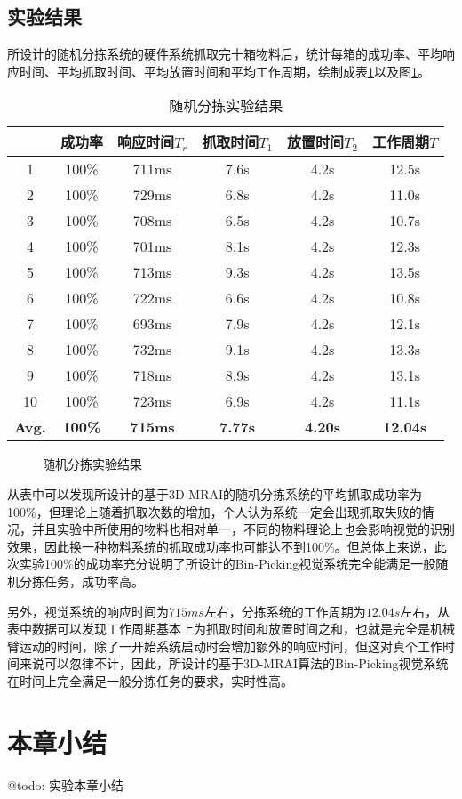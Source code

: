 \subsection{实验结果}
所设计的随机分拣系统的硬件系统抓取完十箱物料后，统计每箱的成功率、平均响应时间、平均抓取时间、平均放置时间和平均工作周期，绘制成表\ref{tab:app_res}以及图\ref{fig:app_res}。
\begin{table}[ht]
  \centering
  \begin{tabular}{cccccc}
    \toprule
    &成功率&响应时间$T_r$&抓取时间$T_1$&放置时间$T_2$&工作周期$T$ \\
    \midrule
    1&100\%&711ms&7.6s&4.2s&12.5s \\
    2&100\%&729ms&6.8s&4.2s&11.0s \\
    3&100\%&708ms&6.5s&4.2s&10.7s \\
    4&100\%&701ms&8.1s&4.2s&12.3s \\
    5&100\%&713ms&9.3s&4.2s&13.5s \\
    6&100\%&722ms&6.6s&4.2s&10.8s \\
    7&100\%&693ms&7.9s&4.2s&12.1s \\
    8&100\%&732ms&9.1s&4.2s&13.3s \\
    9&100\%&718ms&8.9s&4.2s&13.1s \\
    10&100\%&723ms&6.9s&4.2s&11.1s \\
    \bf{Avg.}&\bf{100\%}&\bf{715ms}&\bf{7.77s}&\bf{4.20s}&\bf{12.04s} \\
    \bottomrule
  \end{tabular}
  \caption{随机分拣实验结果}
  \label{tab:app_res}
\end{table}
\begin{figure}[ht]
  \centering
  \hskip0.5cm
  \vfill
  \hskip0.5cm
  \vfill
  \caption{随机分拣实验结果}
  \label{fig:app_res}
\end{figure}
从表中可以发现所设计的基于3D-MRAI的随机分拣系统的平均抓取成功率为100\%，但理论上随着抓取次数的增加，个人认为系统一定会出现抓取失败的情况，并且实验中所使用的物料也相对单一，不同的物料理论上也会影响视觉的识别效果，因此换一种物料系统的抓取成功率也可能达不到100\%。但总体上来说，此次实验100\%的成功率充分说明了所设计的Bin-Picking视觉系统完全能满足一般随机分拣任务，成功率高。

另外，视觉系统的响应时间为$715ms$左右，分拣系统的工作周期为$12.04s$左右，从表中数据可以发现工作周期基本上为抓取时间和放置时间之和，也就是完全是机械臂运动的时间，除了一开始系统启动时会增加额外的响应时间，但这对真个工作时间来说可以忽律不计，因此，所设计的基于3D-MRAI算法的Bin-Picking视觉系统在时间上完全满足一般分拣任务的要求，实时性高。

\section{本章小结}
@todo: 实验本章小结

